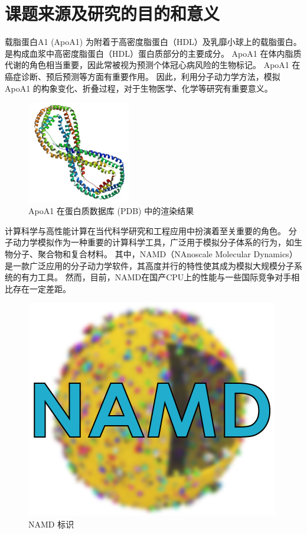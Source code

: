 \section{课题来源及研究的目的和意义}

载脂蛋白A1 (ApoA1) 为附着于高密度脂蛋白（HDL）及乳靡小球上的载脂蛋白。
是构成血浆中高密度脂蛋白（HDL）蛋白质部分的主要成分。
ApoA1 在体内脂质代谢的角色相当重要，因此常被视为预测个体冠心病风险的生物标记。
ApoA1 在癌症诊断\cite{limwjxtd}、预后预测\cite{apoayuhz}等方面有重要作用。
因此，利用分子动力学方法，模拟 ApoA1 的构象变化、折叠过程，对于生物医学、化学等研究有重要意义。


\begin{figure}[h]
    \centering
    \includegraphics[width=0.4\textwidth]{images/PBB_Protein_APOA1_image.jpg}
    \caption{ApoA1 在蛋白质数据库 (PDB) 中的渲染结果}
\end{figure}

计算科学与高性能计算在当代科学研究和工程应用中扮演着至关重要的角色。
分子动力学模拟作为一种重要的计算科学工具，广泛用于模拟分子体系的行为，如生物分子、聚合物和复合材料。
其中，NAMD（NAnoscale Molecular Dynamics）\cite{phillips2005scalable}是一款广泛应用的分子动力学软件，其高度并行的特性使其成为模拟大规模分子系统的有力工具。
然而，目前，NAMD在国产CPU上的性能与一些国际竞争对手相比存在一定差距。


\begin{figure}[h]
    \centering
    \includegraphics{images/namd-logo.png}
    \caption{NAMD 标识}
\end{figure}

